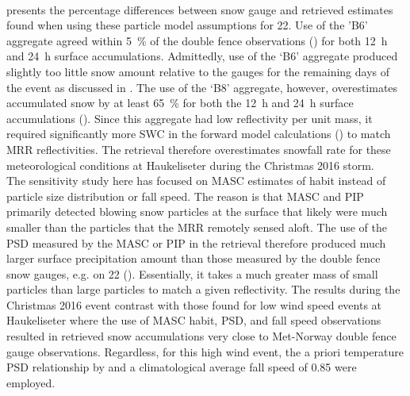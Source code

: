 \\
 presents the percentage differences between snow gauge and retrieved estimates found when using these particle model assumptions for \SI{22}{\dec}. Use of the 'B6' aggregate agreed within \SI{5}{\percent} of the double fence observations () for both \SI{12}{\hour} and \SI{24}{\hour} surface accumulations. Admittedly, use of the ‘B6’ aggregate produced slightly too little snow amount relative to the gauges for the remaining days of the event as discussed in . The use of the ‘B8’ aggregate, however, overestimates accumulated snow by at least \SI{65}{\percent} for both the \SI{12}{\hour} and \SI{24}{\hour} surface accumulations (). Since this aggregate had low reflectivity per unit mass, it required significantly more SWC in the forward model calculations () to match MRR reflectivities. The retrieval therefore overestimates snowfall rate for these meteorological conditions at Haukeliseter during the Christmas 2016 storm.
\\
The sensitivity study here has focused on MASC estimates of habit instead of particle size distribution or fall speed. The reason is that MASC and PIP primarily detected blowing snow particles at the surface that likely were much smaller than the particles that the MRR remotely sensed aloft. The use of the PSD measured by the MASC or PIP in the retrieval therefore produced much larger surface precipitation amount than those measured by the double fence snow gauges, e.g. on \SI{22}{\dec} (). Essentially, it takes a much greater mass of small particles than large particles to match a given reflectivity. The results during the Christmas 2016 event contrast with those found for low wind speed events at Haukeliseter where the use of MASC habit, PSD, and fall speed observations resulted in retrieved snow accumulations very close to Met-Norway double fence gauge observations.  Regardless, for this high wind event, the a priori temperature PSD relationship by \citet{wood_estimation_2011} and a climatological average fall speed of \SI{0.85}{\mPs} \citep[personal communication,][]{Priv_Comm_Schirle} were employed.
